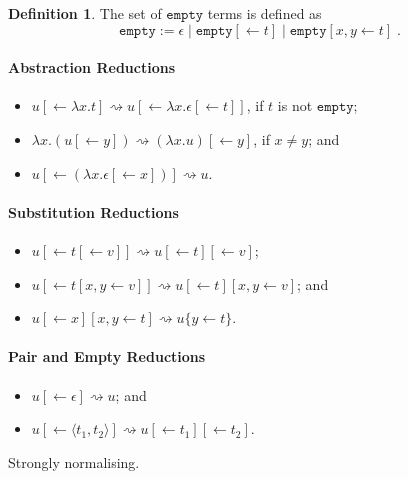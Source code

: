 \documentclass[11pt,a4paper]{article}
\theoremstyle{definition}
\newtheorem{definition}{Definition}
\theoremstyle{plain}
\theoremstyle{remark}
\begin{document}
\newcommand{\tempty}{{\mathtt{empty}}}

\begin{definition}
	The set of $\tempty$ terms is defined as
	\[\tempty:=\epsilon\;|\;\tempty[\leftarrow t]\;|\;\tempty[x,y\leftarrow t]\;.\]
\end{definition}

\paragraph{Abstraction Reductions}

\begin{itemize}
	\item $u[\leftarrow\lambda x.t]\rightsquigarrow u[\leftarrow\lambda x.\epsilon[\leftarrow t]]$, if $t$ is not $\tempty$;
	\item $\lambda x.(u[\leftarrow y])\rightsquigarrow (\lambda x.u)[\leftarrow y]$, if $x\neq y$; and
	\item $u[\leftarrow(\lambda x.\epsilon[\leftarrow x])]\rightsquigarrow u$.
\end{itemize}

\paragraph{Substitution Reductions}

\begin{itemize}
	\item $u[\leftarrow t[\leftarrow v]]\rightsquigarrow u[\leftarrow t][\leftarrow v]$;
	\item $u[\leftarrow t[x,y\leftarrow v]]\rightsquigarrow u[\leftarrow t][x,y\leftarrow v]$; and
	\item $u[\leftarrow x][x,y\leftarrow t]\rightsquigarrow u\{y\leftarrow t\}$.
\end{itemize}

\paragraph{Pair and Empty Reductions}

\begin{itemize}
	\item $u[\leftarrow\epsilon]\rightsquigarrow u$; and
	\item $u[\leftarrow\langle t_1,t_2\rangle]\rightsquigarrow u[\leftarrow t_1][\leftarrow t_2]$.
\end{itemize}

Strongly normalising.
\end{document}
